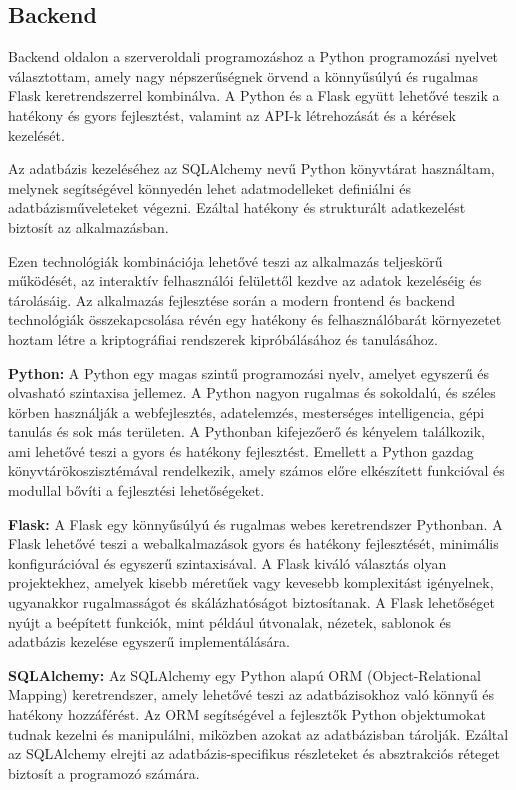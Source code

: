\newpage
\subsection{Backend}

Backend oldalon a szerveroldali programozáshoz a Python programozási nyelvet választottam, amely nagy népszerűségnek örvend a könnyűsúlyú és rugalmas Flask keretrendszerrel kombinálva. A Python és a Flask együtt lehetővé teszik a hatékony és gyors fejlesztést, valamint az API-k létrehozását és a kérések kezelését.

Az adatbázis kezeléséhez az SQLAlchemy nevű Python könyvtárat használtam, melynek segítségével könnyedén lehet adatmodelleket definiálni és adatbázisműveleteket végezni. Ezáltal hatékony és strukturált adatkezelést biztosít az alkalmazásban.

Ezen technológiák kombinációja lehetővé teszi az alkalmazás teljeskörű működését, az interaktív felhasználói felülettől kezdve az adatok kezeléséig és tárolásáig. Az alkalmazás fejlesztése során a modern frontend és backend technológiák összekapcsolása révén egy hatékony és felhasználóbarát környezetet hoztam létre a kriptográfiai rendszerek kipróbálásához és tanulásához.

\vspace{10pt}
\textbf {Python:}
A Python egy magas szintű programozási nyelv, amelyet egyszerű és olvasható szintaxisa jellemez. A Python nagyon rugalmas és sokoldalú, és széles körben használják a webfejlesztés, adatelemzés, mesterséges intelligencia, gépi tanulás és sok más területen. A Pythonban kifejezőerő és kényelem találkozik, ami lehetővé teszi a gyors és hatékony fejlesztést. Emellett a Python gazdag könyvtárökoszisztémával rendelkezik, amely számos előre elkészített funkcióval és modullal bővíti a fejlesztési lehetőségeket.

\vspace{10pt}
\textbf {Flask:}
A Flask egy könnyűsúlyú és rugalmas webes keretrendszer Pythonban. A Flask lehetővé teszi a webalkalmazások gyors és hatékony fejlesztését, minimális konfigurációval és egyszerű szintaxisával. A Flask kiváló választás olyan projektekhez, amelyek kisebb méretűek vagy kevesebb komplexitást igényelnek, ugyanakkor rugalmasságot és skálázhatóságot biztosítanak. A Flask lehetőséget nyújt a beépített funkciók, mint például útvonalak, nézetek, sablonok és adatbázis kezelése egyszerű implementálására.

\vspace{10pt}
\textbf {SQLAlchemy:}
Az SQLAlchemy egy Python alapú ORM (Object-Relational Mapping) keretrendszer, amely lehetővé teszi az adatbázisokhoz való könnyű és hatékony hozzáférést. Az ORM segítségével a fejlesztők Python objektumokat tudnak kezelni és manipulálni, miközben azokat az adatbázisban tárolják. Ezáltal az SQLAlchemy elrejti az adatbázis-specifikus részleteket és absztrakciós réteget biztosít a programozó számára.

